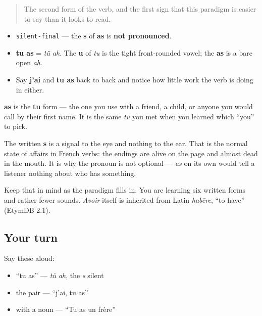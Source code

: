 \label{lesson:FR-C14-as}



\begin{quote}
The second form of the verb, and the first sign that this paradigm is easier to say than it looks to read.
\end{quote}

\begin{sounds}
\begin{itemize}
\raggedright
  \item \texttt{silent-final} — the \textbf{s} of \textbf{as} is \textbf{not pronounced}.
  \item \textbf{tu as} = \emph{tü ah}. The \textbf{u} of \emph{tu} is the tight front-rounded vowel; the \textbf{as} is a bare open \emph{ah}.
  \item Say \textbf{j'ai} and \textbf{tu as} back to back and notice how little work the verb is doing in either.
\end{itemize}
\end{sounds}

\begin{cousinweb}
\textbf{as} is the \textbf{tu} form — the one you use with a friend, a child, or anyone you would call by their first name. It is the same \emph{tu} you met when you learned which \textquotedblleft{}you\textquotedblright{} to pick.

The written \textbf{s} is a signal to the eye and nothing to the ear. That is the normal state of affairs in French verbs: the endings are alive on the page and almost dead in the mouth. It is why the pronoun is not optional — \emph{as} on its own would tell a listener nothing about who has something.

Keep that in mind as the paradigm fills in. You are learning six written forms and rather fewer sounds. \emph{Avoir} itself is inherited from Latin \emph{habēre}, \textquotedblleft{}to have\textquotedblright{} (EtymDB 2.1).
\end{cousinweb}

\subsection*{Your turn}
Say these aloud:

\begin{itemize}
\raggedright
  \item \textquotedblleft{}tu as\textquotedblright{} — \emph{tü ah}, the \emph{s} silent
  \item the pair — \textquotedblleft{}j'ai, tu as\textquotedblright{}
  \item with a noun — \textquotedblleft{}Tu as un frère\textquotedblright{}
\end{itemize}

